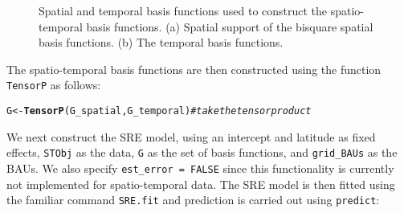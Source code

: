 \documentclass{article}\usepackage[]{graphicx}\usepackage[]{color}
\makeatletter
\newcommand{\hlcom}[1]{\textcolor[rgb]{0.678,0.584,0.686}{\textit{#1}}}%
\newcommand{\hlstd}[1]{\textcolor[rgb]{0.345,0.345,0.345}{#1}}%
\newcommand{\hlkwb}[1]{\textcolor[rgb]{0.69,0.353,0.396}{#1}}%
\newcommand{\hlkwd}[1]{\textcolor[rgb]{0.737,0.353,0.396}{\textbf{#1}}}%
\newenvironment{kframe}{%
 \def\at@end@of@kframe{}%
 \ifinner\ifhmode%
  \def\at@end@of@kframe{\end{minipage}}%
  \begin{minipage}{\columnwidth}%
 \fi\fi%
 \def\FrameCommand##1{\hskip\@totalleftmargin \hskip-\fboxsep
 \colorbox{shadecolor}{##1}\hskip-\fboxsep
     \hskip-\linewidth \hskip-\@totalleftmargin \hskip\columnwidth}%
 \MakeFramed {\advance\hsize-\width
   \@totalleftmargin\z@ \linewidth\hsize
   \@setminipage}}%
 {\par\unskip\endMakeFramed%
 \at@end@of@kframe}
\newenvironment{knitrout}{}{} %
\renewcommand{\tt} {\texttt}
\makeatother
\begin{document}
\begin{knitrout}
\color{fgcolor}\begin{figure}
\caption{Spatial and temporal basis functions used to construct the spatio-temporal basis functions. (a)  Spatial support of the bisquare spatial basis functions. (b) The temporal basis functions.\label{fig:STbasis}}\label{fig:unnamed-chunk-44}
\end{figure}


\end{knitrout}

\noindent The spatio-temporal basis functions are then constructed using the function \tt{TensorP} as follows:

\begin{knitrout}
\color{fgcolor}\begin{kframe}
\begin{alltt}
\hlstd{G} \hlkwb{<-} \hlkwd{TensorP}\hlstd{(G_spatial,G_temporal)}         \hlcom{# take the tensor product}
\end{alltt}
\end{kframe}
\end{knitrout}

\vspace{0.1in}

 We next construct the SRE model, using an intercept and latitude as fixed effects, \tt{STObj} as the data, \tt{G} as the set of basis functions, and \tt{grid\_BAUs} as the BAUs. We also specify \tt{est\_error = FALSE} since this functionality is currently not implemented for spatio-temporal data. The SRE model is then fitted using the familiar command \tt{SRE.fit} and prediction is carried out using \tt{predict}:
\end{document}
